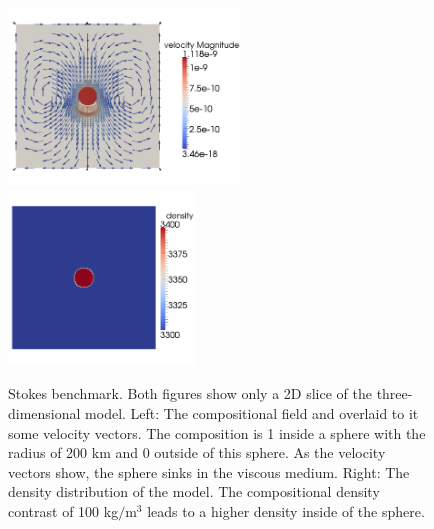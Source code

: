 \documentclass{article}
\begin{document}
\begin{figure}
  \begin{center}
    \includegraphics[width=0.55\textwidth]{cookbooks/benchmarks/stokes/stokes-velocity}
    \hfill
    \includegraphics[width=0.44\textwidth]{cookbooks/benchmarks/stokes/stokes-density}
  \end{center}
  \caption{Stokes benchmark. Both figures show only a 2D slice of the
      three-dimensional model.
      Left: The compositional field and overlaid to it some velocity vectors.
      The composition is 1 inside a sphere with the radius of 200 km and 0
      outside of this sphere. As the velocity vectors show, the sphere sinks
      in the viscous medium.
      Right: The density distribution of the model. The compositional density
      contrast of 100 kg$/\text{m}^3$ leads to a higher density inside of the
      sphere.}
  \label{fig:stokes-falling-sphere-2d}
\end{figure}
\end{document}
